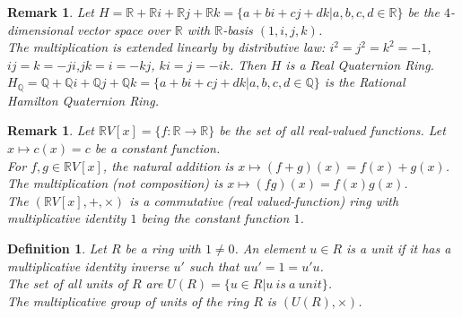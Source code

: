 \documentclass[a4paper,sfsidenotes,openany]{tufte-book}
\theoremstyle{theorem}
\newtheorem{definition}[theorem]{Definition}
\newtheorem{remark}[theorem]{Remark}
\begin{document}
\begin{fullwidth}
\begin{remark}
Let $H=\mathbb{R} + \mathbb{R} i + \mathbb{R} j + \mathbb{R} k = \{a+bi+cj+dk|a,b,c,d \in \mathbb{R}\}$ be the $4$-dimensional vector space over $\mathbb{R}$ with $\mathbb{R}$-basis $(1, i, j, k)$.\\
The multiplication is extended linearly by distributive law: $i^2 = j^2 = k^2 = -1$, $ij=k=-ji$,$jk=i=-kj$, $ki=j=-ik$. Then $H$ is a \textit{{\color{blue} Real Quaternion Ring}}.\\
$H_\mathbb{Q}=\mathbb{Q}+\mathbb{Q}i+\mathbb{Q}j+\mathbb{Q}k=\{a+bi+cj+dk|a, b, c, d\in \mathbb{Q}\}$ is the \textit{{\color{blue} Rational Hamilton Quaternion Ring}}.\\
\end{remark}
\>

\begin{remark}
Let $\mathbb{R}V[x]=\{f:\mathbb{R}\rightarrow\mathbb{R}\}$ be the set of all real-valued functions. Let $x\mapsto c(x) = c$ be a constant function.\\
For $f, g \in \mathbb{R}V[x]$, the natural addition is $x\mapsto (f+g)(x) = f(x)+g(x)$.\\
The multiplication (not composition) is $x\mapsto (fg)(x)=f(x)g(x)$.\\
The $(\mathbb{R}V[x], +, \times)$ is a commutative \textit{{\color{blue} (real valued-function) ring}} with multiplicative identity $1$ being the constant function $1$.\\
\end{remark}
\>

\begin{definition}
Let $R$ be a ring with $1 \neq 0$. An element $u \in R$ is a \textit{{\color{blue} unit}} if it has a multiplicative identity inverse $u'$ such that $uu'=1=u'u$.\\
The \textit{{\color{blue} set of all units}} of $R$ are $U(R)=\{u\in R | u \ is \ a \ unit\}$.\\
The \textit{{\color{blue} multiplicative group of units of the ring}} $R$ is $(U(R), \times)$.\\
\end{definition}
\>


\end{fullwidth}
\end{document}
